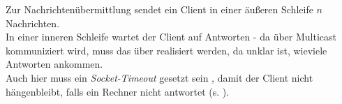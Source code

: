 \noindent
Zur Nachrichtenübermittlung sendet ein Client in einer äußeren Schleife $n$ Nachrichten.\\
In einer inneren Schleife wartet der Client auf Antworten - da über Multicast kommuniziert wird, muss das über  realisiert werden, da unklar ist, wieviele Antworten ankommen.\\
Auch hier muss ein \textit{Socket-Timeout} gesetzt sein , damit der Client nicht hängenbleibt, falls ein Rechner nicht antwortet (s. \cite[279, Listing 5.6]{Oec22}).


